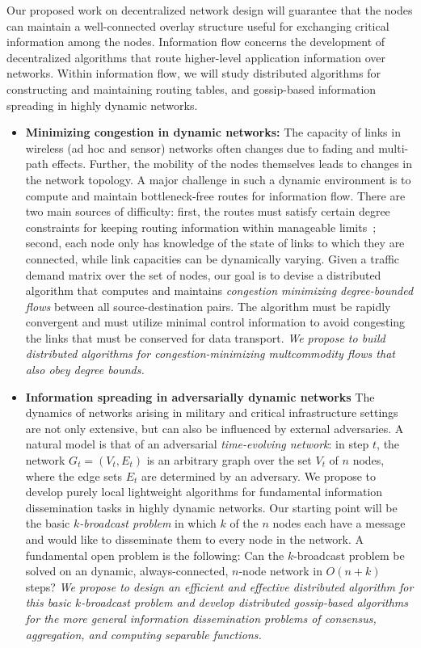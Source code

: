  Our proposed work on decentralized network
design will guarantee that the nodes can maintain a well-connected
overlay structure useful for exchanging critical information among the
nodes.  Information flow concerns the development of decentralized
algorithms that route higher-level application information over
networks.  Within information flow, we will study distributed
algorithms for constructing and maintaining routing tables, and
gossip-based information spreading in highly dynamic networks.

\begin{itemize}
\item
{\bf Minimizing congestion in dynamic networks:} The capacity of links
in wireless (ad hoc and sensor) networks often changes due to fading
and multi-path effects.  Further, the mobility of the nodes themselves
leads to changes in the network topology.  A major challenge in such a
dynamic environment is to compute and maintain bottleneck-free routes
for information flow.  There are two main sources of difficulty:
first, the routes must satisfy certain degree constraints for keeping
routing information within manageable limits~\cite{chen+rs:flow};
second, each node only has knowledge of the state of links to which
they are connected, while link capacities can be dynamically varying.
Given a traffic demand matrix over the set of nodes, our goal is to
devise a distributed algorithm that computes and maintains {\em
  congestion minimizing degree-bounded flows}\/ between all
source-destination pairs.  The algorithm must be rapidly convergent
and must utilize minimal control information to avoid congesting the
links that must be conserved for data transport. {\em We propose to
  build distributed algorithms for congestion-minimizing multcommodity
  flows that also obey degree bounds.}

\item
{\bf Information spreading in adversarially dynamic networks} The
dynamics of networks arising in military and critical infrastructure
settings are not only extensive, but can also be influenced by
external adversaries.  A natural model is that of an adversarial {\em
  time-evolving network}: in step $t$, the network $G_t = (V_t, E_t)$
is an arbitrary graph over the set $V_t$ of $n$ nodes, where the edge
sets $E_t$ are determined by an adversary.  We propose to develop
purely local lightweight algorithms for fundamental information
dissemination tasks in highly dynamic networks.  Our starting point
will be the basic {\em $k$-broadcast problem} in which $k$ of the $n$ nodes
each have a message and would like to disseminate them to every node
in the network.  A fundamental open problem is the following: Can the
$k$-broadcast problem be solved on an dynamic, always-connected,
$n$-node network in $O(n + k)$ steps? {\em We propose to
  design an efficient and effective distributed algorithm for this
  basic $k$-broadcast problem and develop distributed gossip-based
  algorithms for the more general information dissemination problems
  of consensus, aggregation, and computing separable functions.}


\end{itemize}

